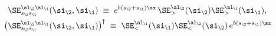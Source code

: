 \begin{equation}\begin{aligned}
\SE^{\al_\2\al_\1}_{s_\2s_\1}(\si_\2,\si_\1)&
\;\equiv\;
e^{b(s_\2+s_\1)\sx} \,\SE_>^{\al_\2}(\si_\2)\SE_>^{\al_\1}(\si_\1),\\
\big(\SE^{\al_\2\al_\1}_{s_\2s_\1}(\si_\2,\si_\1) & \big)^{\dagger}
\;\equiv\;
\SE_<^{\al_\1}(\si_\1)\SE_<^{\al_\2}(\si_\2)\,e^{b(s_\2+s_\1)\sx}
\end{aligned}\end{equation}

